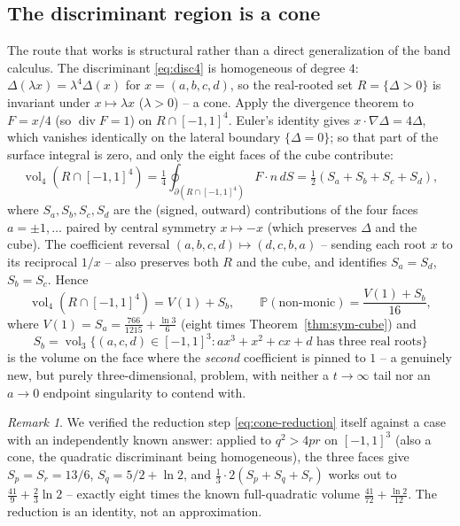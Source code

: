 \documentclass[11pt,reqno]{amsart}
\theoremstyle{plain}
\theoremstyle{remark}
\newtheorem{remark}[theorem]{Remark}
\DeclareMathOperator{\vol}{vol}
\newcommand{\Prb}{\mathbb{P}}
\newcommand{\disc}{\Delta}
\begin{document}
\subsection{The discriminant region is a cone}

The route that works is structural rather than a direct generalization of the
band calculus. The discriminant \eqref{eq:disc4} is homogeneous of degree $4$:
$\disc(\lambda x)=\lambda^4\disc(x)$ for $x=(a,b,c,d)$, so the real-rooted set
$R=\{\disc>0\}$ is invariant under $x\mapsto\lambda x$ ($\lambda>0$) --
a cone. Apply the divergence theorem to $F=x/4$ (so $\operatorname{div}F=1$)
on $R\cap[-1,1]^4$. Euler's identity gives $x\cdot\nabla\disc=4\disc$, which
vanishes identically on the lateral boundary $\{\disc=0\}$; so that part of
the surface integral is zero, and only the eight faces of the cube
contribute:
\[
  \vol_4(R\cap[-1,1]^4) = \tfrac14\oint_{\partial(R\cap[-1,1]^4)} F\cdot n\,dS
  = \tfrac12(S_a+S_b+S_c+S_d),
\]
where $S_a,S_b,S_c,S_d$ are the (signed, outward) contributions of the four
faces $a=\pm1,\ldots$ paired by central symmetry
$x\mapsto-x$ (which preserves $\disc$ and the cube). The coefficient reversal
$(a,b,c,d)\mapsto(d,c,b,a)$ -- sending each root $x$ to its reciprocal $1/x$ --
also preserves both $R$ and the cube, and identifies $S_a=S_d$, $S_b=S_c$.
Hence
\begin{equation} \label{eq:cone-reduction}
  \vol_4(R\cap[-1,1]^4)=V(1)+S_b, \qquad \Prb(\text{non-monic})=\frac{V(1)+S_b}{16},
\end{equation}
where $V(1)=S_a=\tfrac{766}{1215}+\tfrac{\ln3}{6}$ (eight times
Theorem~\ref{thm:sym-cube}) and
\[
  S_b = \vol_3\bigl\{(a,c,d)\in[-1,1]^3 : ax^3+x^2+cx+d \text{ has three real roots}\bigr\}
\]
is the volume on the face where the \emph{second} coefficient is pinned to
$1$ -- a genuinely new, but purely three-dimensional, problem, with neither a
$t\to\infty$ tail nor an $a\to0$ endpoint singularity to contend with.

\begin{remark}
We verified the reduction step \eqref{eq:cone-reduction} itself against a case
with an independently known answer: applied to $q^2>4pr$ on $[-1,1]^3$ (also a
cone, the quadratic discriminant being homogeneous), the three faces give
$S_p=S_r=13/6$, $S_q=5/2+\ln2$, and $\tfrac13\cdot2(S_p+S_q+S_r)$ works out to
$\tfrac{41}{9}+\tfrac23\ln2$ -- exactly eight times the known full-quadratic
volume $\tfrac{41}{72}+\tfrac{\ln2}{12}$. The reduction is an identity, not an
approximation.
\end{remark}
\end{document}
